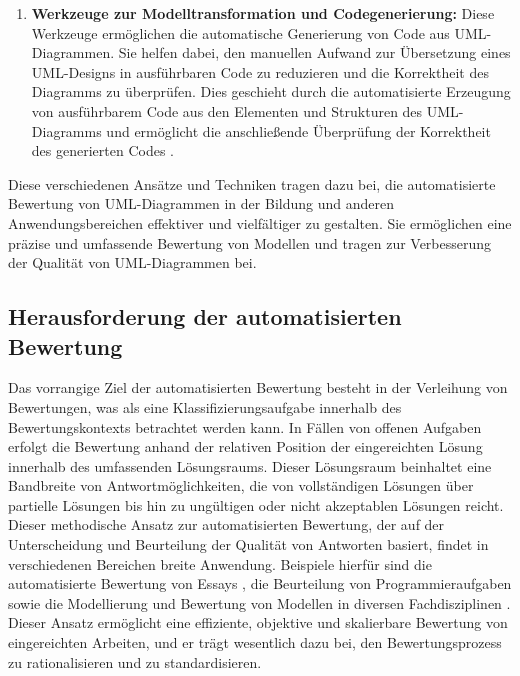 \begin{enumerate}
    \begin{enumerate}
        \item \textbf{Werkzeuge zur Modelltransformation und Codegenerierung:}  Diese Werkzeuge ermöglichen die automatische Generierung von Code aus UML-Diagrammen. Sie helfen dabei, den manuellen Aufwand zur Übersetzung eines UML-Designs in ausführbaren Code zu reduzieren und die Korrektheit des Diagramms zu überprüfen. Dies geschieht durch die automatisierte Erzeugung von ausführbarem Code aus den Elementen und Strukturen des UML-Diagramms und ermöglicht die anschließende Überprüfung der Korrektheit des generierten Codes \cite{sturm2002generating}.
    \end{enumerate}
\end{enumerate}

Diese verschiedenen Ansätze und Techniken tragen dazu bei, die automatisierte Bewertung von UML-Diagrammen in der Bildung und anderen Anwendungsbereichen effektiver und vielfältiger zu gestalten. Sie ermöglichen eine präzise und umfassende Bewertung von Modellen und tragen zur Verbesserung der Qualität von UML-Diagrammen bei.

\subsection{Herausforderung der automatisierten Bewertung}

Das vorrangige Ziel der automatisierten Bewertung besteht in der Verleihung von Bewertungen, was als eine Klassifizierungsaufgabe innerhalb des Bewertungskontexts betrachtet werden kann. In Fällen von offenen Aufgaben erfolgt die Bewertung anhand der relativen Position der eingereichten Lösung innerhalb des umfassenden Lösungsraums. Dieser Lösungsraum beinhaltet eine Bandbreite von Antwortmöglichkeiten, die von vollständigen Lösungen über partielle Lösungen bis hin zu ungültigen oder nicht akzeptablen Lösungen reicht. Dieser methodische Ansatz zur automatisierten Bewertung, der auf der Unterscheidung und Beurteilung der Qualität von Antworten basiert, findet in verschiedenen Bereichen breite Anwendung. Beispiele hierfür sind die automatisierte Bewertung von Essays \cite{valenti2003overview}, die Beurteilung von Programmieraufgaben \cite{gross2012feedback} sowie die Modellierung und Bewertung von Modellen in diversen Fachdisziplinen \cite{sousa2015structural}. Dieser Ansatz ermöglicht eine effiziente, objektive und skalierbare Bewertung von eingereichten Arbeiten, und er trägt wesentlich dazu bei, den Bewertungsprozess zu rationalisieren und zu standardisieren.


